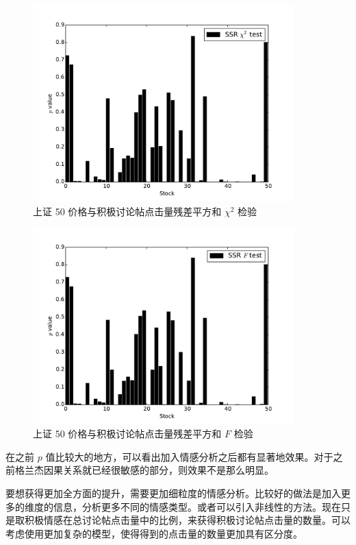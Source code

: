 \begin{figure}
  \centering
  \includegraphics[width=0.9\textwidth]{plots/price_click_count_positive_granger_on_sse_50_ssr_chi2test.pdf}
  \caption{上证 50 价格与积极讨论帖点击量残差平方和 $\chi^{2}$ 检验}
  \label{price_click_count:12}
\end{figure}

\begin{figure}
  \centering
  \includegraphics[width=0.9\textwidth]{plots/price_click_count_positive_granger_on_sse_50_ssr_ftest.pdf}
  \caption{上证 50 价格与积极讨论帖点击量残差平方和 $F$ 检验}
  \label{price_click_count:13}
\end{figure}

在之前 $p$ 值比较大的地方，可以看出加入情感分析之后都有显著地效果。对于之前格兰杰因果关系就已经很敏感的部分，则效果不是那么明显。

要想获得更加全方面的提升，需要更加细粒度的情感分析。比较好的做法是加入更多的维度的信息，分析更多不同的情感类型。或者可以引入非线性的方法。现在只是取积极情感在总讨论帖点击量中的比例，来获得积极讨论帖点击量的数量。可以考虑使用更加复杂的模型，使得得到的点击量的数量更加具有区分度。

